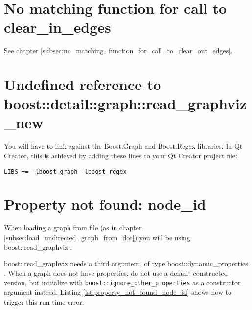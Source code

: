\section{No matching function for call to clear\_in\_edges}
\label{subsec:no_matching_function_for_call_to_clear_in_edges}

See chapter \ref{subsec:no_matching_function_for_call_to_clear_out_edges}.

\section{Undefined reference to boost::detail::graph::read\_graphviz\_new}
\label{subsec:undefined_reference_to_read_graphviz_new}

You will have to link 
against the Boost.Graph and Boost.Regex libraries.
In Qt Creator, this is achieved by adding these lines to your Qt Creator
project file:

\begin{verbatim}
LIBS += -lboost_graph -lboost_regex 
\end{verbatim}

\section{Property not found: node\_id}
\label{subsec:property_not_found_node_id}

When loading a graph from file 
(as in chapter \ref{subsec:load_undirected_graph_from_dot})
you will be using 
boost::read\_graphviz .

boost::read\_graphviz 
needs a third argument, of type boost::dynamic\_properties
. 
When a graph does not have properties, do not use a default constructed
version, but initialize with \verb;boost::ignore_other_properties;
as a constructor argument instead. Listing \ref{lst:property_not_found_node_id} shows how to trigger this run-time error.


